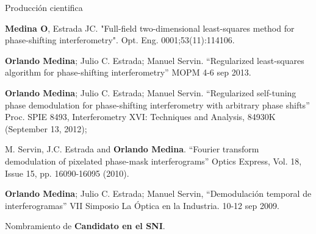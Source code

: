 \documentclass[]{beamer}
\begin{document}
\begin{frame}{Producci\'on cientifica}

\begin{itemize}
\small{
            \item  \textbf{Medina O}, Estrada JC. "Full-field two-dimensional 
              least-squares method for phase-shifting interferometry".
              Opt. Eng. 0001;53(11):114106.
            \item \textbf{Orlando Medina}; Julio C. Estrada; Manuel Servin. 
              “Regularized least-squares algorithm for phase-shifting 
              interferometry” MOPM 4-6 sep 2013.
            \item \textbf{Orlando Medina}; Julio C. Estrada; Manuel Servin. 
              “Regularized self-tuning phase demodulation for
              phase-shifting interferometry with arbitrary phase
              shifts” Proc. SPIE 8493, Interferometry XVI: 
              Techniques and Analysis, 84930K (September 13, 2012);
            \item M. Servin, J.C. Estrada and \textbf{Orlando Medina}. 
              “Fourier transform demodulation of pixelated phase-mask
              interferograms” Optics Express, Vol. 18, Issue 15,
              pp. 16090-16095 (2010).
              \item \textbf{Orlando Medina}; Julio C. Estrada; Manuel Servin,
                “Demodulación temporal de interferogramas” VII
                Simposio La \'Optica en la Industria. 10-12 sep 2009.
              \item Nombramiento de \textbf{Candidato en el SNI}.
}
\end{itemize}
\end{frame}
\end{document}
